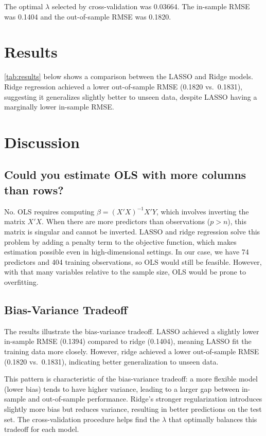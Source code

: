 \documentclass[12pt]{article}
\begin{document}
The optimal $\lambda$ selected by cross-validation was 0.03664. The in-sample RMSE was 0.1404 and the out-of-sample RMSE was 0.1820.

\section*{Results}

\autoref{tab:results} below shows a comparison between the LASSO and Ridge models. Ridge regression achieved a lower out-of-sample RMSE (0.1820 vs.\ 0.1831), suggesting it generalizes slightly better to unseen data, despite LASSO having a marginally lower in-sample RMSE.



\section*{Discussion}

\subsection*{Could you estimate OLS with more columns than rows?}

No. OLS requires computing $\hat{\beta} = (X'X)^{-1}X'Y$, which involves inverting the matrix $X'X$. When there are more predictors than observations ($p > n$), this matrix is singular and cannot be inverted. LASSO and ridge regression solve this problem by adding a penalty term to the objective function, which makes estimation possible even in high-dimensional settings. In our case, we have 74 predictors and 404 training observations, so OLS would still be feasible. However, with that many variables relative to the sample size, OLS would be prone to overfitting.

\subsection*{Bias-Variance Tradeoff}

The results illustrate the bias-variance tradeoff. LASSO achieved a slightly lower in-sample RMSE (0.1394) compared to ridge (0.1404), meaning LASSO fit the training data more closely. However, ridge achieved a lower out-of-sample RMSE (0.1820 vs.\ 0.1831), indicating better generalization to unseen data.

This pattern is characteristic of the bias-variance tradeoff: a more flexible model (lower bias) tends to have higher variance, leading to a larger gap between in-sample and out-of-sample performance. Ridge's stronger regularization introduces slightly more bias but reduces variance, resulting in better predictions on the test set. The cross-validation procedure helps find the $\lambda$ that optimally balances this tradeoff for each model.
\end{document}
